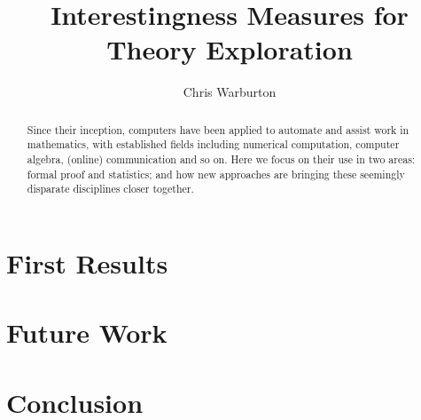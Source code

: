 \documentclass[]{article}
\begin{document}
\pagestyle{headings}  %

\title{Interestingness Measures for Theory Exploration}

\author{Chris Warburton}


\maketitle              %

\begin{abstract}
Since their inception, computers have been applied to automate and assist work in mathematics, with established fields including numerical computation, computer algebra, (online) communication and so on. Here we focus on their use in two areas: formal proof and statistics; and how new approaches are bringing these seemingly disparate disciplines closer together.
\end{abstract}







\section{First Results}

\iffalse
TODO

Future work?
Hypothetical use cases?
\fi



\section{Future Work}
\label{future}

\iffalse
TODO

interestingness
\fi

\iffalse

QuickSpec: extend or extinguish?

Improve and find other use cases/scenarios for clustering and feature extraction

Other directions for Theory Exploration?

How about systems based on term rewriting, logic programming, etc.?
\fi

\section{Conclusion}
\label{conclusion}



\end{document}
